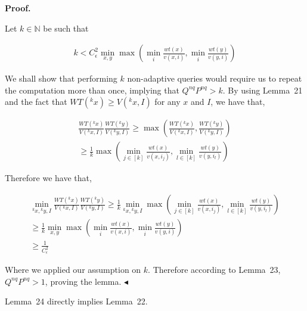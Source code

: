 \par\medskip\noindent\textbf{Proof.}\par




Let $k\in\mathbb{N}$ be such that\par


\[\begin{gathered}
\displaystyle k<C^{2}_{\epsilon}\min_{x,y}\max\left(\min_{i}\frac{wt(x)}{v(x,i)},\min_{i}\frac{wt(y)}{v(y,i)}\right)
\end{gathered}\]


We shall show that performing $k$ non-adaptive queries would require us to repeat the computation more than once, implying that $Q^{nq}P^{nq}>k$. By using Lemma 21 and the fact that $WT({}^{k}x)\geq V({}^{k}x,I)$ for any $x$ and $I$, we have that,\par


\[\begin{gathered}
\displaystyle\frac{WT({}^{k}x)}{V({}^{k}x,I)}\frac{WT({}^{k}y)}{V({}^{k}y,I)} \displaystyle\geq\max\left(\frac{WT({}^{k}x)}{V({}^{k}x,I)},\frac{WT({}^{k}y)}{V({}^{k}y,I)}\right) \\
\displaystyle\geq\frac{1}{k}\max\left(\min_{j\in[k]}\frac{wt(x)}{v(x,i_{j})},\min_{l\in[k]}\frac{wt(y)}{v(y,i_{l})}\right)
\end{gathered}\]


Therefore we have that,\par


\[\begin{gathered}
\displaystyle\min_{{}^{k}x,{}^{k}y,I}\frac{WT({}^{k}x)}{V({}^{k}x,I)}\frac{WT({}^{k}y)}{V({}^{k}y,I)} \displaystyle\geq\frac{1}{k}\min_{{}^{k}x,{}^{k}y,I}\max\left(\min_{j\in[k]}\frac{wt(x)}{v(x,i_{j})},\min_{l\in[k]}\frac{wt(y)}{v(y,i_{l})}\right) \\
\displaystyle\geq\frac{1}{k}\min_{x,y}\max\left(\min_{i}\frac{wt(x)}{v(x,i)},\min_{i}\frac{wt(y)}{v(y,i)}\right) \\
\displaystyle\geq\frac{1}{C^{2}_{\epsilon}}
\end{gathered}\]


Where we applied our assumption on $k$. Therefore according to Lemma 23, $Q^{nq}P^{nq}>1$, proving the lemma.
$\blacktriangleleft$\par




Lemma 24 directly implies Lemma 22.\par







